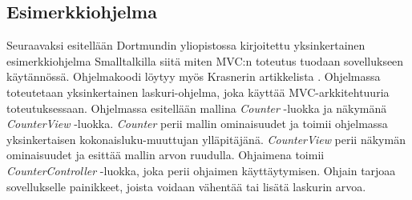 \documentclass[utf8]{gradu3}
\begin{document}
\subsection{Esimerkkiohjelma}
Seuraavaksi esitellään  Dortmundin yliopistossa kirjoitettu yksinkertainen esimerkkiohjelma Smalltalkilla siitä miten MVC:n toteutus tuodaan sovellukseen käytännössä. Ohjelmakoodi löytyy myös Krasnerin artikkelista \cite[s. 20]{krasner_desc}. Ohjelmassa toteutetaan yksinkertainen laskuri-ohjelma, joka käyttää MVC-arkkitehtuuria toteutuksessaan. Ohjelmassa esitellään mallina \emph{Counter} -luokka ja näkymänä \emph{CounterView} -luokka. \emph{Counter} perii mallin ominaisuudet ja
toimii ohjelmassa yksinkertaisen kokonaisluku-muuttujan ylläpitäjänä. \emph{CounterView} perii näkymän ominaisuudet ja esittää mallin arvon ruudulla.
Ohjaimena toimii \emph{CounterController} -luokka, joka perii ohjaimen käyttäytymisen. Ohjain tarjoaa sovellukselle painikkeet, joista voidaan vähentää
tai lisätä laskurin arvoa.
\end{document}
